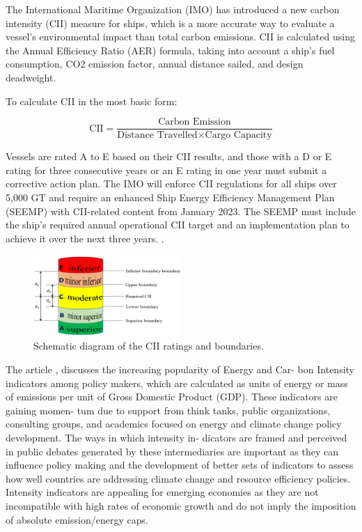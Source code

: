 The International Maritime Organization (IMO) has introduced a new carbon intensity (CII) measure for ships, which is a more accurate way to evaluate a vessel's environmental impact than total carbon emissions.
CII is calculated using the Annual Efficiency Ratio (AER) formula, taking into account a ship's fuel consumption, CO2 emission factor, annual distance sailed, and design deadweight.

To calculate CII in the most basic form:

\begin{equation}
    \text{CII} = \frac{\text{Carbon Emission}}{\text{Distance Travelled} \times \text{Cargo Capacity}}
    \label{eq:cii}
\end{equation}


Vessels are rated A to E based on their CII results, and those with a D or E rating for three consecutive years or an E rating in one year must submit a corrective action plan.
The IMO will enforce CII regulations for all ships over 5,000 GT and require an enhanced Ship Energy Efficiency Management Plan (SEEMP) with CII-related content from January 2023.
The SEEMP must include the ship's required annual operational CII target and an implementation plan to achieve it over the next three years. \autocite{chuah2023implementation}.

\begin{figure}[h]
    \centering
    \includegraphics[width=0.5\textwidth]{images/cii_ratings.jpeg}
    \caption{Schematic diagram of the CII ratings and boundaries. \autocite{tsai2023effects}}
    \label{ciiRating}
\end{figure}


The article \cite{rodriguez2020indicators}, discusses the increasing popularity of Energy and Car- bon Intensity indicators among policy makers, which are calculated as units of energy or mass of emissions per unit of Gross Domestic Product (GDP).
These indicators are gaining momen- tum due to support from think tanks, public organizations, consulting groups, and academics focused on energy and climate change policy development.
The ways in which intensity in- dicators are framed and perceived in public debates generated by these intermediaries are important as they can influence policy making and the development of better sets of indicators to assess how well countries are addressing climate change and resource efficiency policies.
Intensity indicators are appealing for emerging economies as they are not incompatible with high rates of economic growth and do not imply the imposition of absolute emission/energy caps.


